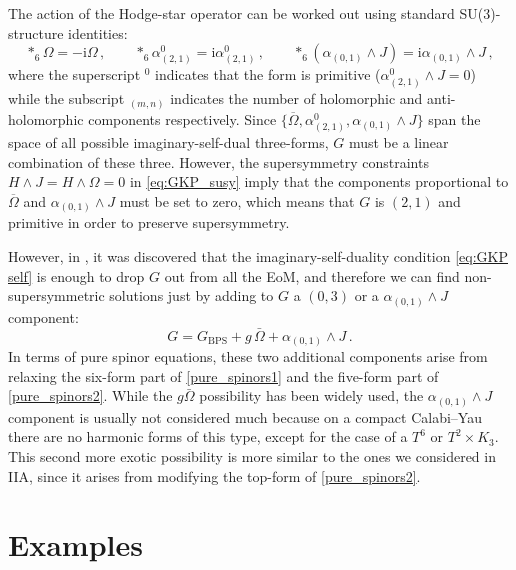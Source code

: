 \documentclass[12pt]{article}
\newcommand{\ii}{\mathrm{i}}
\begin{document}
The action of the Hodge-star operator can be worked out using standard SU(3)-structure identities:
\begin{equation}
*_6 \Omega = - \ii \Omega \, , \qquad *_6 \alpha^0_{(2,1)} = \ii \alpha^0_{(2,1)} \, , \qquad *_6 (\alpha_{(0,1)} \wedge J) = \ii \alpha_{(0,1)} \wedge J \, ,
\end{equation}
where the superscript $^0$ indicates that the form is primitive ($\alpha^0_{(2,1)} \wedge J=0$) while the subscript $_{(m,n)}$ indicates the number of holomorphic and anti-holomorphic components respectively.
Since $\{\overline{\Omega}, \alpha^0_{(2,1)}, \alpha_{(0,1)} \wedge J\}$ span the space of all possible imaginary-self-dual three-forms, $G$ must be a linear combination of these three. However, the supersymmetry constraints $H \wedge J = H \wedge \Omega = 0$ in \eqref{eq:GKP_susy} imply that the components proportional to $\overline{\Omega}$ and $\alpha_{(0,1)} \wedge J$ must be set to zero, which means that $G$ is $(2,1)$ and primitive in order to preserve supersymmetry.

However, in \cite{giddings-kachru-polchinski}, it was discovered that the imaginary-self-duality condition \eqref{eq:GKP self} is enough to drop $G$ out from all the EoM, and therefore we can find non-supersymmetric solutions just by adding to $G$ a $(0,3)$ or a $\alpha_{(0,1)} \wedge J$ component:
\begin{equation}\label{eq:G-sb}
	G= G_\mathrm{BPS} + g \,\bar\Omega + \alpha_{(0,1)} \wedge J\,.
\end{equation}
In terms of pure spinor equations, these two additional components arise from relaxing the six-form part of \eqref{pure_spinors1} and the five-form part of \eqref{pure_spinors2}. While the $g \bar \Omega$ possibility has been widely used, the $\alpha_{(0,1)} \wedge J$ component is usually not considered much because on a compact Calabi--Yau there are no harmonic forms of this type, except for the case of a $T^6$ or $T^2 \times K_3$. This second more exotic possibility is more similar to the ones we considered in IIA, since it arises from modifying the top-form of \eqref{pure_spinors2}.







\section{Examples} \label{sec:ex}
\end{document}
